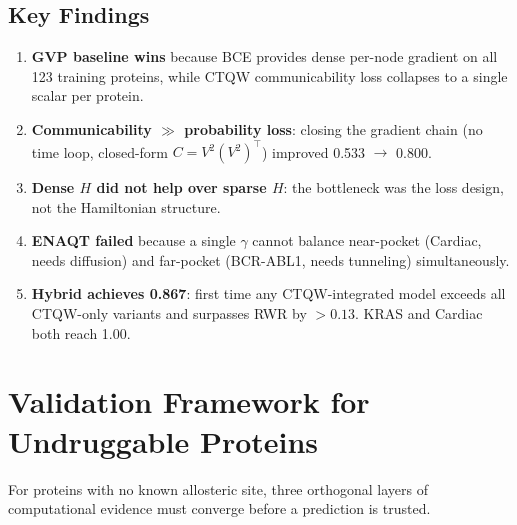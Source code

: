 \documentclass[11pt,a4paper]{article}
\begin{document}
\subsection{Key Findings}

\begin{enumerate}[leftmargin=*, itemsep=2pt]
  \item \textbf{GVP baseline wins} because BCE provides dense per-node gradient
        on all 123 training proteins, while CTQW communicability loss collapses
        to a single scalar per protein.

  \item \textbf{Communicability $\gg$ probability loss}: closing the gradient chain
        (no time loop, closed-form $C = V^2(V^2)^\top$) improved 0.533 $\to$ 0.800.

  \item \textbf{Dense $H$ did not help over sparse $H$}: the bottleneck was the
        loss design, not the Hamiltonian structure.

  \item \textbf{ENAQT failed} because a single $\gamma$ cannot balance
        near-pocket (Cardiac, needs diffusion) and far-pocket
        (BCR-ABL1, needs tunneling) simultaneously.

  \item \textbf{Hybrid achieves 0.867}: first time any CTQW-integrated model
        exceeds all CTQW-only variants and surpasses RWR by $>0.13$.
        KRAS and Cardiac both reach 1.00.
\end{enumerate}

\section{Validation Framework for Undruggable Proteins}

For proteins with no known allosteric site, three orthogonal layers of
computational evidence must converge before a prediction is trusted.
\end{document}
